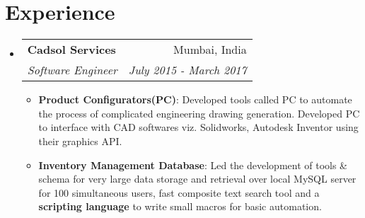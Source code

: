 \documentclass[letterpaper,11pt]{article}
\makeatletter
\newcommand{\resumeItem}[2]{
  \item\small{
    \textbf{#1}{: #2 \vspace{-2pt}}
  }
}
\newcommand{\resumeSubheading}[4]{
  \vspace{-1pt}\item
    \begin{tabular*}{0.97\textwidth}{l@{\extracolsep{\fill}}r}
      \textbf{#1} & #2 \\
      \textit{\small#3} & \textit{\small #4} \\
    \end{tabular*}\vspace{-5pt}
}
\newcommand{\resumeSubHeadingListStart}{\begin{itemize}[leftmargin=*]}
\newcommand{\resumeSubHeadingListEnd}{\end{itemize}}
\newcommand{\resumeItemListStart}{\begin{itemize}}
\newcommand{\resumeItemListEnd}{\end{itemize}\vspace{-5pt}}
\makeatother
\begin{document}
\section{Experience}
  \resumeSubHeadingListStart
    \resumeSubheading
      {Cadsol Services}{Mumbai, India}
      {Software Engineer}{July 2015 - March 2017}
      \resumeItemListStart
        \resumeItem{Product Configurators(PC)}
          {Developed tools called PC to automate the process of complicated engineering drawing generation. Developed PC to interface with CAD softwares viz. Solidworks, Autodesk Inventor using their graphics API.}
        \resumeItem{Inventory Management Database}{Led the development of tools \& schema for very large data storage and retrieval over local MySQL server for 100 simultaneous users, fast composite text search tool and a \textbf{scripting language} to write small macros for basic automation.}
      \resumeItemListEnd
  \resumeSubHeadingListEnd
\end{document}
